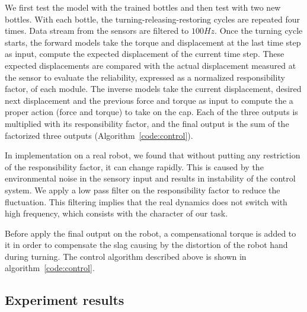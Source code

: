 We first test the model with the trained bottles and then test with two new bottles. With each bottle, the turning-releasing-restoring cycles are repeated four times. Data stream from the sensors are filtered to $100Hz$. Once the turning cycle starts, the forward models take the torque and displacement at the last time step as input, compute the expected displacement of the current time step. These expected displacements are compared with the actual displacement measured at the sensor to evaluate the reliability, expressed as a normalized responsibility factor, of each module. The inverse models take the current displacement, desired next displacement and the previous force and torque as input to compute the a proper action (force and torque) to take on the cap. Each of the three outputs is multiplied with its responsibility factor, and the final output is the sum of the factorized three outputs (Algorithm~\ref{code:control}).

In implementation on a real robot, we found that without putting any restriction of the responsibility factor, it can change rapidly. This is caused by the environmental noise in the sensory input and results in instability of the control system. We apply a low pass filter on the responsibility factor to reduce the fluctuation. This filtering implies that the real dynamics does not switch with high frequency, which consists with the character of our task. %


Before apply the final output on the robot, a compensational torque is added to it in order to compensate the slag causing by the distortion of the robot hand during turning. The control algorithm described above is shown in algorithm~\ref{code:control}.



\subsection{Experiment results}



